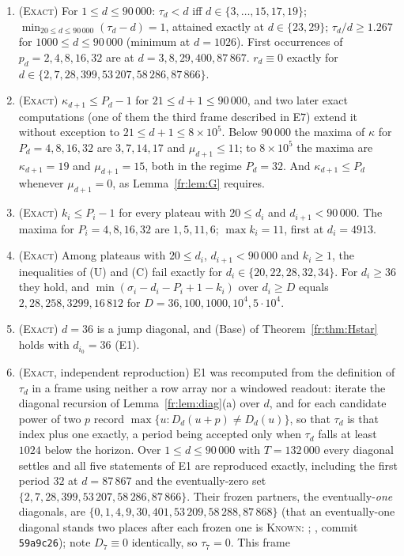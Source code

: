 \documentclass[11pt]{article}
\theoremstyle{definition}
\theoremstyle{remark}
\newcommand{\EXACT}{\textsc{Exact}}
\newcommand{\KNOWN}{\textsc{Known}}
\begin{document}
\begin{enumerate}
\item[\textbf{E1}] (\EXACT) For $1\le d\le90\,000$: $\tau_d<d$ iff $d\in\{3,\dots,15,17,19\}$;
$\min_{20\le d\le90\,000}(\tau_d-d)=1$, attained exactly at $d\in\{23,29\}$;
$\tau_d/d\ge1.267$ for $1000\le d\le90\,000$ (minimum at $d=1026$).
First occurrences of $p_d=2,4,8,16,32$ are at $d=3,8,29,400,87\,867$.
$r_d\equiv0$ exactly for $d\in\{2,7,28,399,53\,207,58\,286,87\,866\}$.
\item[\textbf{E2}] (\EXACT) $\kappa_{d+1}\le P_d-1$ for $21\le d+1\le90\,000$, and two later exact computations
(one of them the third frame described in E7) extend it without exception to $21\le d+1\le8\times10^{5}$.
Below $90\,000$ the maxima of $\kappa$ for $P_d=4,8,16,32$ are $3,7,14,17$ and $\mu_{d+1}\le11$; to
$8\times10^{5}$ the maxima are $\kappa_{d+1}=19$ and $\mu_{d+1}=15$, both in the regime $P_d=32$. And
$\kappa_{d+1}\le P_d$ whenever $\mu_{d+1}=0$, as Lemma~\ref{fr:lem:G} requires.
\item[\textbf{E3}] (\EXACT) $k_i\le P_i-1$ for every plateau with $20\le d_i$ and $d_{i+1}<90\,000$.
The maxima for $P_i=4,8,16,32$ are $1,5,11,6$; $\max k_i=11$, first at $d_i=4913$.
\item[\textbf{E4}] (\EXACT) Among plateaus with $20\le d_i$, $d_{i+1}<90\,000$ and $k_i\ge1$, the inequalities of
(U) and (C) fail exactly for $d_i\in\{20,22,28,32,34\}$. For $d_i\ge36$ they hold, and
$\min(\sigma_i-d_i-P_i+1-k_i)$ over $d_i\ge D$ equals $2,28,258,3299,16\,812$ for
$D=36,100,1000,10^4,5\cdot10^4$.
\item[\textbf{E5}] (\EXACT) $d=36$ is a jump diagonal, and (Base) of Theorem~\ref{fr:thm:Hstar} holds with $d_{i_0}=36$ (E1).
\item[\textbf{E6}] (\EXACT, independent reproduction) E1 was recomputed from the definition of $\tau_d$ in a frame using
neither a row array nor a windowed readout: iterate the diagonal recursion of Lemma~\ref{fr:lem:diag}(a) over $d$, and for
each candidate power of two $p$ record $\max\{u: D_d(u+p)\neq D_d(u)\}$, so that $\tau_d$ is that index plus one exactly, a
period being accepted only when $\tau_d$ falls at least $1024$ below the horizon. Over $1\le d\le90\,000$ with $T=132\,000$
every diagonal settles and all five statements of E1 are reproduced exactly, including the first period $32$ at $d=87\,867$
and the eventually-zero set $\{2,7,28,399,53\,207,58\,286,87\,866\}$. Their frozen partners, the eventually-\emph{one}
diagonals, are $\{0,1,4,9,30,401,53\,209,58\,288,87\,868\}$ (that an eventually-one diagonal stands two places after each frozen one is \KNOWN: \cite{Rowland}; \cite{Dib}, commit \texttt{59a9c26}); note $D_7\equiv0$ identically, so $\tau_7=0$. This frame

\end{enumerate}
\end{document}
